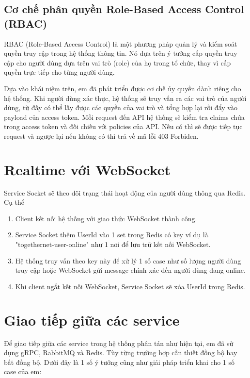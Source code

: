 \documentclass[../index.tex]{subfiles}
\begin{document}
    \subsection{Cơ chế phân quyền Role-Based Access Control (RBAC)}
    RBAC (Role-Based Access Control) là một phương pháp quản lý và kiểm soát quyền truy cập trong hệ thống thông tin. Nó dựa trên ý tưởng cấp quyền truy cập cho người dùng dựa trên vai trò (role) của họ trong tổ chức, thay vì cấp quyền trực tiếp cho từng người dùng.

    Dựa vào khái niệm trên, em đã phát triển được cơ chế ủy quyền dành riêng cho hệ thống. Khi người dùng xác thực, hệ thống sẽ truy vấn ra các vai trò của người dùng, từ đấy có thể lấy được các quyền của vai trò và tổng hợp lại rồi đẩy vào payload của access token. Mỗi request đến API hệ thống sẽ kiểm tra claims chứa trong access token và đối chiếu với policies của API. Nếu có thì sẽ được tiếp tục request và ngược lại nếu không có thì trả về mã lỗi 403 Forbiden.

    \section{Realtime với WebSocket}
    Service Socket sẽ theo dõi trạng thái hoạt động của người dùng thông qua Redis. Cụ thể
    \begin{enumerate}
        \item Client kết nối hệ thống với giao thức WebSocket thành công. 
        \item Service Socket thêm UserId vào 1 set trong Redis có key ví dụ là "togethernet-user-online" như 1 nơi để lưu trữ kết nối WebSocket.
        \item Hệ thống truy vấn theo key này để xử lý 1 số case như số lượng người dùng truy cập hoặc WebSocket gửi message chính xác đến người dùng đang online.
        \item Khi client ngắt kết nối WebSocket, Service Socket sẽ xóa UserId trong Redis.
    \end{enumerate}

    \section{Giao tiếp giữa các service}
    Để giao tiếp giữa các service trong hệ thống phân tán như hiện tại, em đã sử dụng gRPC, RabbitMQ và Redis. Tùy từng trường hợp cần thiết đồng bộ hay bất đồng bộ. Dưới đây là 1 số ý tưởng cũng như giải pháp triển khai cho 1 số case của em:
    
\end{document}
